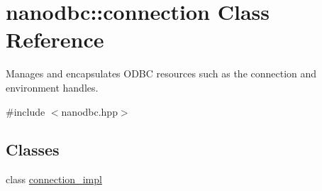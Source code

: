\hypertarget{classnanodbc_1_1connection}{}\section{nanodbc\+::connection Class Reference}
\label{classnanodbc_1_1connection}


Manages and encapsulates O\+D\+BC resources such as the connection and environment handles.  




{\ttfamily \#include $<$nanodbc.\+hpp$>$}

\subsection*{Classes}
\begin{DoxyCompactItemize}
\item 
class \mbox{\hyperlink{classnanodbc_1_1connection_1_1connection__impl}{connection\+\_\+impl}}
\end{DoxyCompactItemize}
